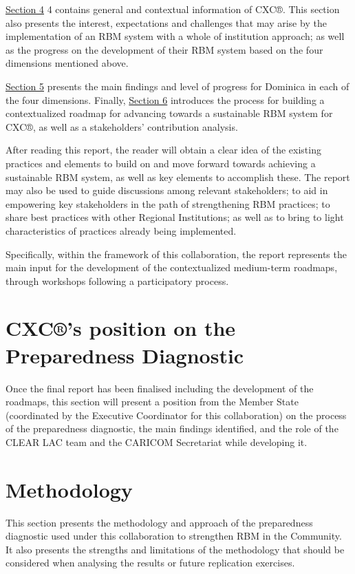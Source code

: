 \documentclass[
  10pt,
]{book}
\begin{document}
\protect\hyperlink{section4}{Section 4} 4 contains general and contextual information of CXC®. This section also presents the interest, expectations and challenges that may arise by the implementation of an RBM system with a whole of institution approach; as well as the progress on the development of their RBM system based on the four dimensions mentioned above.

\protect\hyperlink{section5}{Section 5} presents the main findings and level of progress for Dominica in each of the four dimensions. Finally, \protect\hyperlink{section6}{Section 6} introduces the process for building a contextualized roadmap for advancing towards a sustainable RBM system for CXC®, as well as a stakeholders' contribution analysis.

After reading this report, the reader will obtain a clear idea of the existing practices and elements to build on and move forward towards achieving a sustainable RBM system, as well as key elements to accomplish these. The report may also be used to guide discussions among relevant stakeholders; to aid in empowering key stakeholders in the path of strengthening RBM practices; to share best practices with other Regional Institutions; as well as to bring to light characteristics of practices already being implemented.

Specifically, within the framework of this collaboration, the report represents the main input for the development of the contextualized medium-term roadmaps, through workshops following a participatory process.

\hypertarget{section2}{%
\chapter{CXC®'s position on the Preparedness Diagnostic}\label{section2}}

{ Once the final report has been finalised including the development of the roadmaps, this section will present a position from the Member State (coordinated by the Executive Coordinator for this collaboration) on the process of the preparedness diagnostic, the main findings identified, and the role of the CLEAR LAC team and the CARICOM Secretariat while developing it. }

\hypertarget{section3}{%
\chapter{Methodology}\label{section3}}

This section presents the methodology and approach of the preparedness diagnostic used under this collaboration to strengthen RBM in the Community. It also presents the strengths and limitations of the methodology that should be considered when analysing the results or future replication exercises.
\end{document}
